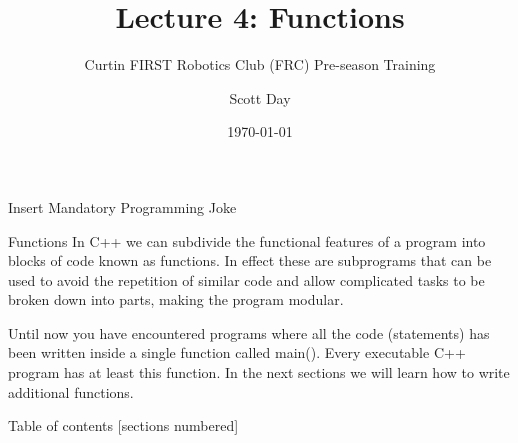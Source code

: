 \documentclass[9pt]{beamer}              %
\title{Lecture 4: Functions}
\subtitle{Curtin FIRST Robotics Club (FRC) Pre-season Training}
\date{\today}
\author{Scott Day}
\institute{Curtin University}
\begin{document}


\maketitle

\begin{frame}[fragile]{Insert Mandatory Programming Joke}
    \begin{center}
    \end{center}
\end{frame}

\begin{frame}[fragile]{Functions}
    In C++ we can subdivide the functional features of a program into blocks of code known as
    functions. In effect these are subprograms that can be used to avoid the repetition of similar
    code and allow complicated tasks to be broken down into parts, making the program modular. \newline

    Until now you have encountered programs where all the code (statements) has been written inside
    a single function called main(). Every executable C++ program has at least this function. In
    the next sections we will learn how to write additional functions.
\end{frame}

\begin{frame}{Table of contents}
  [sections numbered]
  \tableofcontents[hideallsubsections]
\end{frame}
\end{document}
